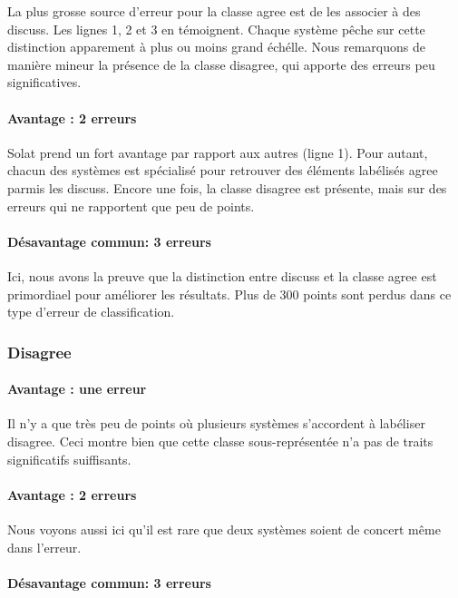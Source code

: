 \documentclass[onecolumn, 12pt]{article}
\begin{document}
 La plus grosse source d'erreur pour la classe agree est de les associer à des discuss.
 Les lignes 1, 2 et 3 en témoignent.
 Chaque système pêche sur cette distinction apparement à plus ou moins grand échélle.
 Nous remarquons de manière mineur la présence de la classe disagree, qui apporte des erreurs peu significatives.
 \paragraph{Avantage : 2 erreurs}
 
 
 Solat prend un fort avantage par rapport aux autres (ligne 1).
 Pour autant, chacun des systèmes est spécialisé pour retrouver des éléments labélisés agree parmis les discuss.
 Encore une fois, la classe disagree est présente, mais sur des erreurs qui ne rapportent que peu de points.
 \paragraph{Désavantage commun: 3 erreurs}
 
 
 Ici, nous avons la preuve que la distinction entre discuss et la classe agree est primordiael pour améliorer les résultats. Plus de 300 points sont perdus dans ce type d'erreur de classification.
 \subsubsection{Disagree}
 \paragraph{Avantage : une erreur}
 
 
 Il n'y a que  très peu de points où plusieurs systèmes s'accordent à labéliser disagree.
 Ceci montre bien que cette classe sous-représentée n'a pas de traits significatifs suiffisants.
 
 \paragraph{Avantage : 2 erreurs}
 
 Nous voyons aussi ici qu'il est rare que deux systèmes soient de concert même dans l'erreur.
 
 \paragraph{Désavantage commun: 3 erreurs}
 
 
\end{document}
